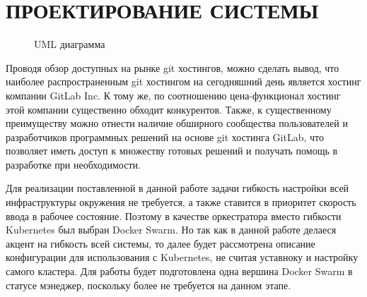\chapter{ПРОЕКТИРОВАНИЕ СИСТЕМЫ}
\label{cha:design}

\begin{figure}
    \centering
    \caption{UML диаграмма}
    \label{fig:fig03}
\end{figure}

Проводя обзор доступных на рынке git хостингов, можно сделать вывод, что наиболее распространенным git хостингом на сегодняшний день является хостинг компании GitLab Inc.
К тому же, по соотношению цена-функционал хостинг этой компании существенно обходит конкурентов.
Также, к существенному преимуществу можно отнести наличие обширного сообщества пользователей и разработчиков программных решений на основе git хостинга GitLab,
что позволяет иметь доступ к множеству готовых решений и получать помощь в разработке при необходимости.

Для реализации поставленной в данной работе задачи гибкость настройки всей инфраструктуры окружения не требуется, а также ставится в приоритет скорость ввода в рабочее состояние.
Поэтому в качестве оркестратора вместо гибкости Kubernetes был выбран Docker Swarm.
Но так как в данной работе делаеся акцент на гибкость всей системы, то далее будет рассмотрена описание конфигурации для использования с Kubernetes, не считая уставноку и настройку самого кластера.
Для работы будет подготовлена одна вершина Docker Swarm в статусе мэнеджер, поскольку более не требуется на данном этапе.

